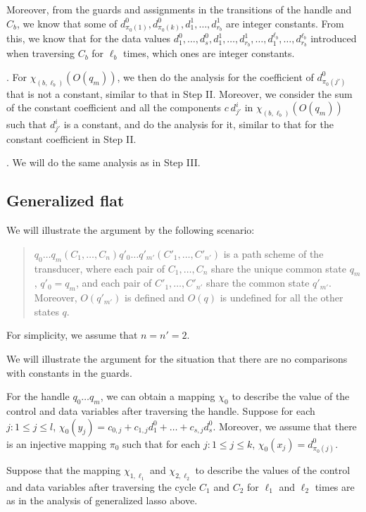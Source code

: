 \documentclass[runningheads,a4paper]{llncs}
\begin{document}
Moreover, from the guards and assignments in the transitions of the handle and $C_b$, we know that some of $d^0_{\pi_0(1)}, d^0_{\pi_0(k)}, d^1_1,\dots, d^1_{r_b}$ are integer constants. From this, we know that for the data values $d^0_1,\dots, d^0_s, d^1_1,\dots, d^1_{r_b}, \dots, d^{\ell_b}_1,\dots, d^{\ell_b}_{r_b}$ introduced when traversing $C_b$ for $\ell_b$ times, which ones are integer constants.

\smallskip

. For $\chi_{(b,\ell_b)}(O(q_m))$, we then do the analysis for the coefficient of $d^0_{\pi_0(j')}$ that is not a constant, similar to that in Step II.  Moreover, we consider the sum of the constant coefficient and all the components $c\ d^{i}_{j'}$ in  $\chi_{(b,\ell_b)}(O(q_m))$ such that $d^i_{j'}$ is a constant, and do the analysis for it, similar to that for the constant coefficient in Step II.

\smallskip

. We will do the same analysis as in Step III.


\subsection{Generalized flat}

We will illustrate the argument by the following scenario:  
\begin{quote}
$q_0\dots q_{m} (C_1,\dots,C_n) q'_0 \dots q'_{m'} (C'_1,\dots,C'_{n'})$ is a path scheme of the transducer, where each pair of $C_1,\dots,C_n$ share the unique common state $q_m$, $q'_0 = q_m$, and each pair of $C'_1,\dots,C'_{n'}$ share the common state $q'_{m'}$. Moreover, $O(q'_{m'})$ is defined and $O(q)$ is undefined for all the other states $q$.
\end{quote}

For simplicity, we assume that $n = n' = 2$.

We will illustrate the argument for the situation that there are no comparisons with constants in the guards.

For the handle $q_0 \dots q_m$, we can obtain a mapping $\chi_0$ to describe the value of the control and data variables after traversing the handle. Suppose for each $j: 1 \le j \le l$,  $\chi_0(y_j) = c_{0,j} + c_{1,j} d^0_1 + \dots + c_{s,j} d^0_s$. Moreover, we assume that there is an injective mapping $\pi_0$ such that for each $j: 1 \le j \le k$, $\chi_0(x_j) = d^0_{\pi_0(j)}$.

Suppose that the mapping $\chi_{1,\ell_1}$ and $\chi_{2,\ell_2}$ to describe the values of the control and data variables after traversing the cycle $C_1$ and $C_2$ for $\ell_1$ and $\ell_2$ times are as in the analysis of generalized lasso above.
\end{document}
